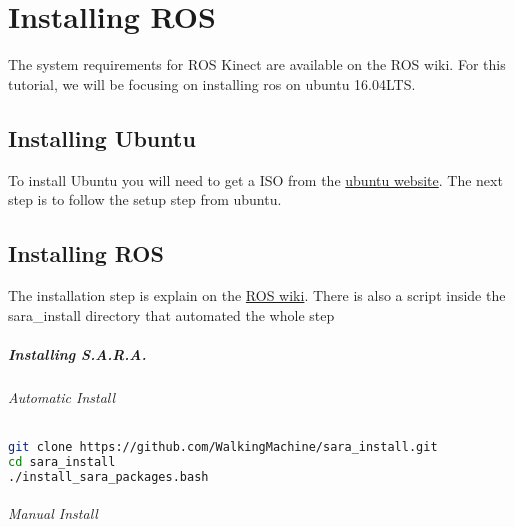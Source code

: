 \chapter{Installing ROS}
The system requirements for ROS Kinect are available on the ROS wiki. For this tutorial, we will be focusing on installing ros on ubuntu 16.04LTS.

\section{Installing Ubuntu}
To install Ubuntu you will need to get a ISO from the \href{www.ubuntu.com}{ubuntu website}. The next step is to follow the setup step from ubuntu.

\section {Installing ROS}
The installation step is explain on the \href{wiki.ros.org/kinetic/Installation/Ubuntu}{ROS wiki}. There is also a script inside the sara\_install directory that automated the whole step 

\paragraph{Installing S.A.R.A.}

\subparagraph{Automatic Install}

\begin{lstlisting}[language=bash,caption={Install S.A.R.A. Packages}]
git clone https://github.com/WalkingMachine/sara_install.git
cd sara_install
./install_sara_packages.bash
\end{lstlisting}

\subparagraph{Manual Install}